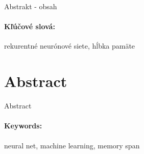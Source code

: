 \documentclass[12pt, oneside]{book}
\begin{document}
Abstrakt - obsah
 

\paragraph*{Kľúčové slová:} rekurentné neurónové siete, hĺbka pamäte


\newpage 
\section*{Abstract}

Abstract


\paragraph*{Keywords:} neural net, machine learning, memory span


%
%



\newpage 

\tableofcontents



\newpage 

\listoffigures


\mainmatter


 







\end{document}
